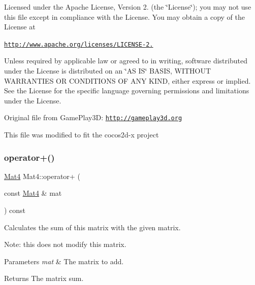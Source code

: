 Licensed under the Apache License, Version 2. (the \char`\"{}\+License\char`\"{}); you may not use this file except in compliance with the License. You may obtain a copy of the License at

\href{http://www.apache.org/licenses/LICENSE-2.0}{\tt http\+://www.\+apache.\+org/licenses/\+L\+I\+C\+E\+N\+S\+E-\/2.}

Unless required by applicable law or agreed to in writing, software distributed under the License is distributed on an \char`\"{}\+A\+S I\+S\char`\"{} B\+A\+S\+IS, W\+I\+T\+H\+O\+UT W\+A\+R\+R\+A\+N\+T\+I\+ES OR C\+O\+N\+D\+I\+T\+I\+O\+NS OF A\+NY K\+I\+ND, either express or implied. See the License for the specific language governing permissions and limitations under the License.

Original file from Game\+Play3D\+: \href{http://gameplay3d.org}{\tt http\+://gameplay3d.\+org}

This file was modified to fit the cocos2d-\/x project \mbox{\label{classMat4_aec8e42aec11573c62fd771cadec2c833}} 
\subsubsection{\texorpdfstring{operator+()}{operator+()}\hspace{0.1cm}{\footnotesize\ttfamily [2/2]}}
{\footnotesize\ttfamily \hyperlink{classMat4}{Mat4} Mat4\+::operator+ (\begin{DoxyParamCaption}\item[{const \hyperlink{classMat4}{Mat4} \&}]{mat }\end{DoxyParamCaption}) const\hspace{0.3cm}{\ttfamily [inline]}}

Calculates the sum of this matrix with the given matrix.

Note\+: this does not modify this matrix.


\begin{DoxyParams}{Parameters}
{\em mat} & The matrix to add. \\
\hline
\end{DoxyParams}
\begin{DoxyReturn}{Returns}
The matrix sum. 
\end{DoxyReturn}
\mbox{\label{classMat4_a1f15bf1f4ff4c4084019732127259df8}} 
